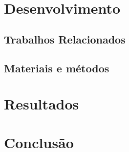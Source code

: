 \documentclass[
	12pt,	
	a4paper,			
	english,			
	french,				
	spanish,			
	brazil,
	oneside,
	sumario=tradicional
	]{abntex2}
\begin{document}
\chapter{Desenvolvimento}



\section{Trabalhos Relacionados}



\section{Materiais e métodos}

\chapter{Resultados}

\chapter{Conclusão}


    





\end{document}
